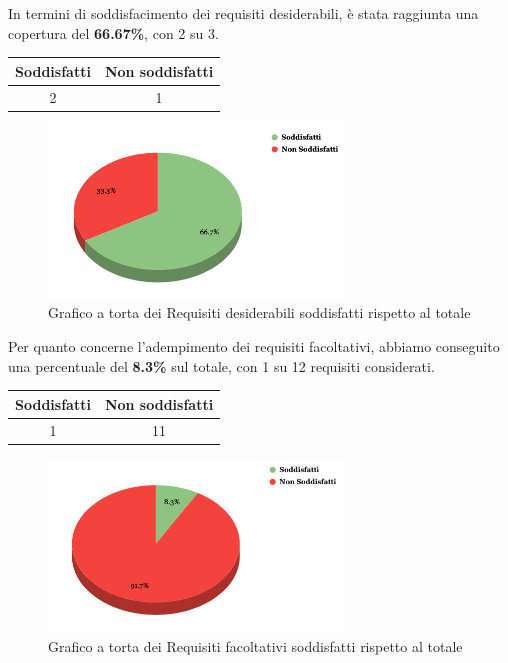 \newpage
In termini di soddisfacimento dei requisiti desiderabili, è stata raggiunta una copertura del \textbf{66.67\%}, con 2 su 3.
\begin{center}
\begin{tabular}{|c|c|}
\hline
\textbf{Soddisfatti} & \textbf{Non soddisfatti} \\
\hline
2 & 1 \\
\hline
\end{tabular}
\end{center}

\begin{figure}[H]
    \centering
    \includegraphics[width=0.7\textwidth]{img/RequisitiDesiderabili.png}
    \caption{Grafico a torta dei Requisiti desiderabili soddisfatti rispetto al totale}
\end{figure}

Per quanto concerne l’adempimento dei requisiti facoltativi, abbiamo conseguito una percentuale del \textbf{8.3\%} sul totale, con 1 su 12 requisiti considerati.
\begin{center}
    \begin{tabular}{|c|c|}
    \hline
    \textbf{Soddisfatti} & \textbf{Non soddisfatti} \\
    \hline
    1 & 11 \\
    \hline
    \end{tabular}
    \end{center}

    \begin{figure}[H]
        \centering
        \includegraphics[width=0.7\textwidth]{img/RequisitiFacoltativi.png}
        \caption{Grafico a torta dei Requisiti facoltativi soddisfatti rispetto al totale}
    \end{figure}
